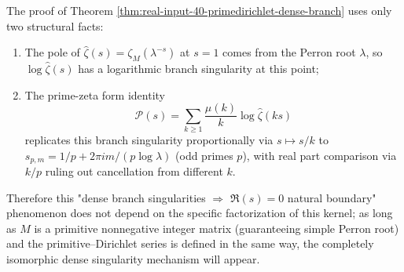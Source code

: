 \begin{remark}\label{rem:primedirichlet-natural-boundary-universal}
The proof of Theorem \ref{thm:real-input-40-primedirichlet-dense-branch} uses only two structural facts:
\begin{enumerate}
  \item The pole of $\widehat{\zeta}(s)=\zeta_M(\lambda^{-s})$ at $s=1$ comes from the Perron root $\lambda$, so $\log\widehat{\zeta}(s)$ has a logarithmic branch singularity at this point;
  \item The prime-zeta form identity
  \[
  \mathcal{P}(s)=\sum_{k\ge 1}\frac{\mu(k)}{k}\log\widehat{\zeta}(ks)
  \]
  replicates this branch singularity proportionally via $s\mapsto s/k$ to $s_{p,m}=1/p+2\pi i m/(p\log\lambda)$ (odd primes $p$), with real part comparison via $k/p$ ruling out cancellation from different $k$.
\end{enumerate}
Therefore this "dense branch singularities \(\Rightarrow\) \(\Re(s)=0\) natural boundary" phenomenon does not depend on the specific factorization of this kernel;
as long as $M$ is a primitive nonnegative integer matrix (guaranteeing simple Perron root) and the primitive--Dirichlet series is defined in the same way, the completely isomorphic dense singularity mechanism will appear.
\end{remark}

